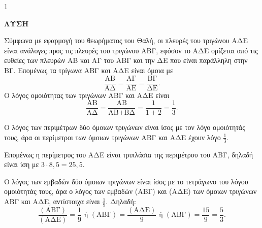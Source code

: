 \begin{ylh}{1}
\end{ylh}

\noindent\textbf{ΛΥΣΗ}
\begin{alist}
    \item[α)] Σύμφωνα με εφαρμογή του θεωρήματος του Θαλή, οι πλευρές του τριγώνου ΑΔΕ είναι ανάλογες προς τις πλευρές του τριγώνου ΑΒΓ, εφόσον το ΑΔΕ ορίζεται από τις ευθείες των πλευρών ΑΒ και ΑΓ του ΑΒΓ και την ΔΕ που είναι παράλληλη στην ΒΓ. Επομένως τα τρίγωνα ΑΒΓ και ΑΔΕ είναι όμοια με
    \[ \frac{\text{ΑΒ}}{\text{ΑΔ}} = \frac{\text{ΑΓ}}{\text{ΑΕ}} = \frac{\text{ΒΓ}}{\text{ΔΕ}}. \]
    Ο λόγος ομοιότητας των τριγώνων ΑΒΓ και ΑΔΕ είναι
    \[ \frac{\text{ΑΒ}}{\text{ΑΔ}} = \frac{\text{ΑΒ}}{\text{ΑΒ}+\text{ΒΔ}} = \frac{1}{1+2} = \frac{1}{3}. \]

    \item[β)] Ο λόγος των περιμέτρων δύο όμοιων τριγώνων είναι ίσος με τον λόγο ομοιότητάς τους, άρα οι περίμετροι των όμοιων τριγώνων ΑΒΓ και ΑΔΕ έχουν λόγο $\frac{1}{3}$.

    Επομένως η περίμετρος του ΑΔΕ είναι τριπλάσια της περιμέτρου του ΑΒΓ, δηλαδή είναι ίση με $3 \cdot 8,5 = 25,5$.

    \item[γ)] Ο λόγος των εμβαδών δύο όμοιων τριγώνων είναι ίσος με το τετράγωνο του λόγου ομοιότητάς τους, άρα ο λόγος των εμβαδών (ΑΒΓ) και (ΑΔΕ) των όμοιων τριγώνων ΑΒΓ και ΑΔΕ, αντίστοιχα είναι $\frac{1}{9}$. Δηλαδή:
    \[ \frac{(\text{ΑΒΓ})}{(\text{ΑΔΕ})} = \frac{1}{9} \text{ ή } (\text{ΑΒΓ}) = \frac{(\text{ΑΔΕ})}{9} \text{ ή } (\text{ΑΒΓ}) = \frac{15}{9} = \frac{5}{3}. \]
\end{alist}